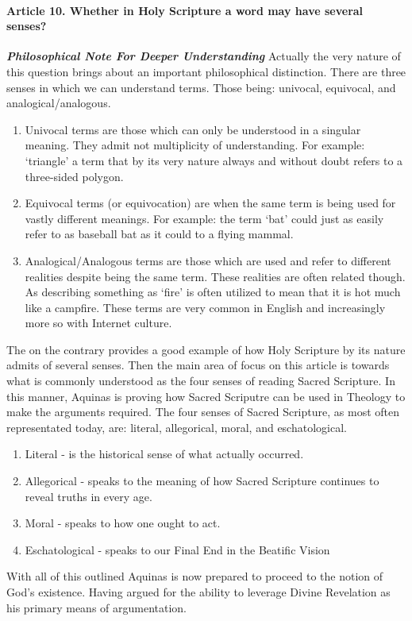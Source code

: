 \documentclass{ucetd}
\begin{document}
\paragraph{Article 10. Whether in Holy Scripture a word may have several senses?}
\textbf{\textit{Philosophical Note For Deeper Understanding}}
Actually the very nature of this question brings about an important philosophical distinction. There are three senses in which we can understand terms. Those being: univocal, equivocal, and analogical/analogous.
\begin{enumerate}
        \item Univocal terms are those which can only be understood in a singular meaning. They admit not multiplicity of understanding. For example: `triangle' a term that by its very nature always and without doubt refers to a three-sided polygon.
        \item Equivocal terms (or equivocation) are when the same term is being used for vastly different meanings. For example: the term `bat' could just as easily refer to as baseball bat as it could to a flying mammal.
        \item Analogical/Analogous terms are those which are used and refer to different realities despite being the same term. These realities are often related though. As describing something as `fire' is often utilized to mean that it is hot much like a campfire. These terms are very common in English and increasingly more so with Internet culture.
\end{enumerate}
The on the contrary provides a good example of how Holy Scripture by its nature admits of several senses. Then the main area of focus on this article is towards what is commonly understood as the four senses of reading Sacred Scripture. In this manner, Aquinas is proving how Sacred Scriputre can be used in Theology to make the arguments required. The four senses of Sacred Scripture, as most often representated today, are: literal, allegorical, moral, and eschatological.
\begin{enumerate}
        \item Literal - is the historical sense of what actually occurred. 
        \item Allegorical - speaks to the meaning of how Sacred Scripture continues to reveal truths in every age.
        \item Moral - speaks to how one ought to act.
        \item Eschatological - speaks to our Final End in the Beatific Vision
\end{enumerate}
With all of this outlined Aquinas is now prepared to proceed to the notion of God's existence. Having argued for the ability to leverage Divine Revelation as his primary means of argumentation.
\end{document}
